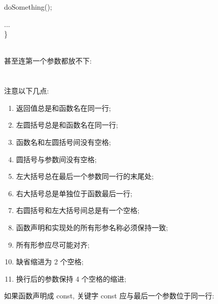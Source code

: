 \documentclass[a4paper,11pt,CJK]{article}
\begin{document}
\begin{CJK}{UTF8}{gbsn}
{\begin{minipage}{400pt}
\hspace{3ex}     doSomething();\par
\hspace{3ex}     ...\\
\indent \}
\end{minipage}
}
\\
甚至连第一个参数都放不下:\\
\\
\\
注意以下几点:
\begin{enumerate}
\item
返回值总是和函数名在同一行;
\item
左圆括号总是和函数名在同一行;
\item
函数名和左圆括号间没有空格;
\item
圆括号与参数间没有空格;
\item
左大括号总在最后一个参数同一行的末尾处;
\item
右大括号总是单独位于函数最后一行;
\item
右圆括号和左大括号间总是有一个空格;
\item
函数声明和实现处的所有形参名称必须保持一致;
\item
所有形参应尽可能对齐;
\item
缺省缩进为 2 个空格;
\item
换行后的参数保持 4 个空格的缩进;
\end{enumerate}
\noindent
如果函数声明成 const, 关键字 const 应与最后一个参数位于同一行:\\
\\
\fbox{
\begin{minipage}{400pt}

\end{minipage}}
\end{CJK}
\end{document}
